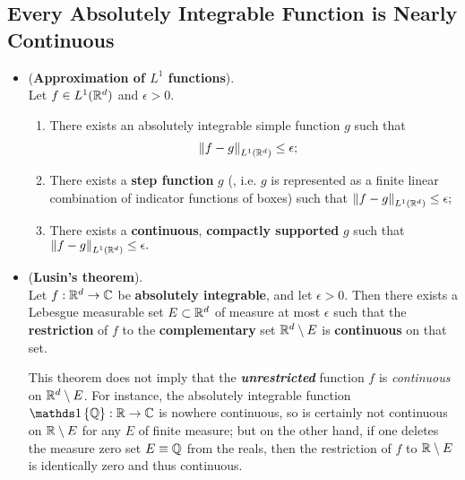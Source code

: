 \documentclass[11pt]{article}
\begin{document}
\subsection{Every Absolutely Integrable Function is Nearly Continuous}
\begin{itemize}
\item \begin{proposition} (\textbf{Approximation of $L^1$ functions}).\\
Let $f \in L^1({\mathbb R}^d)$ and $\epsilon > 0$.
\begin{enumerate}
\item There exists an absolutely integrable simple function $g$ such that
\begin{align*}
\left\|f- g\right\|_{ L^1({\mathbb R}^d)} &\le \epsilon; 
\end{align*}
\item There exists a \textbf{step function} $g$ (, i.e. $g$ is represented as a finite linear combination of indicator functions of boxes) such that $\left\|f- g\right\|_{ L^1({\mathbb R}^d)} \le \epsilon; $
\item There exists a \textbf{continuous}, \textbf{compactly supported} $g$ such that $\left\|f- g\right\|_{ L^1({\mathbb R}^d)} \le \epsilon.$
\end{enumerate}
\end{proposition}


\item \begin{theorem} (\textbf{Lusin's theorem}).\\
Let $f : {\mathbb R}^d \rightarrow {\mathbb C}$ be \textbf{absolutely integrable}, and let $\epsilon > 0$. Then there exists a Lebesgue measurable set $E \subset {\mathbb R}^d$ of measure at most $\epsilon$ such that the \textbf{restriction} of $f$ to the \textbf{complementary} set ${\mathbb R}^d \setminus E$ is \textbf{continuous} on that set. 
\end{theorem}
\begin{remark}
This theorem does not imply that the \emph{\textbf{unrestricted}} function $f$ is \emph{continuous} on ${\mathbb R}^d \setminus  E$. For instance, the absolutely integrable function $\ind{\bQ} : \bR \rightarrow \bC$ is nowhere continuous, so is certainly not continuous
on ${\mathbb R} \setminus  E$ for any $E$ of finite measure; but on the other hand, if one deletes the measure zero set $E \equiv {\mathbb Q}$ from the reals, then the restriction of $f$ to ${\mathbb R} \setminus  E$ is identically zero and thus continuous. \citep{tao2011introduction}
\end{remark}


\end{itemize}
\end{document}
